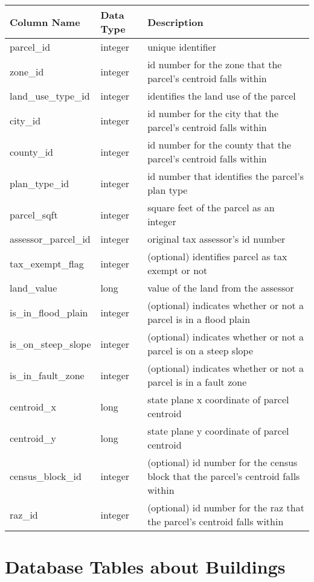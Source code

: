 \begin{tabular}{p{2in}lp{3.5in}}
\textbf{Column Name} & \textbf{Data Type} & \textbf{Description} \\
\hline
parcel\_id & integer & unique identifier \\ \hline
zone\_id & integer &  id number for the zone that the parcel's centroid falls within \\ \hline
land\_use\_type\_id & integer & identifies the land use of the parcel \\ \hline
city\_id & integer & id number for the city that the parcel's centroid falls within \\ \hline
county\_id & integer & id number for the county that the parcel's centroid falls within\\ \hline
plan\_type\_id & integer & id number that identifies the parcel's plan type\\ \hline
parcel\_sqft & integer & square feet of the parcel as an integer \\ \hline
assessor\_parcel\_id & integer & original tax assessor's id number\\ \hline
tax\_exempt\_flag & integer & (optional) identifies parcel as tax exempt or not\\ \hline
land\_value & long & value of the land from the assessor \\ \hline
is\_in\_flood\_plain & integer & (optional) indicates whether or not a parcel is in a flood plain\\ \hline
is\_on\_steep\_slope & integer & (optional) indicates whether or not a parcel is on a steep slope\\ \hline
is\_in\_fault\_zone & integer & (optional) indicates whether or not a parcel is in a fault zone\\ \hline
centroid\_x & long & state plane x coordinate of parcel centroid \\ \hline
centroid\_y & long & state plane y coordinate of parcel centroid\\ \hline
census\_block\_id & integer &  (optional) id number for the census block that the parcel's centroid falls within\\ \hline
raz\_id & integer & (optional) id number for the raz that the parcel's centroid falls within\\ \hline
\end{tabular}

\section{Database Tables about Buildings}

